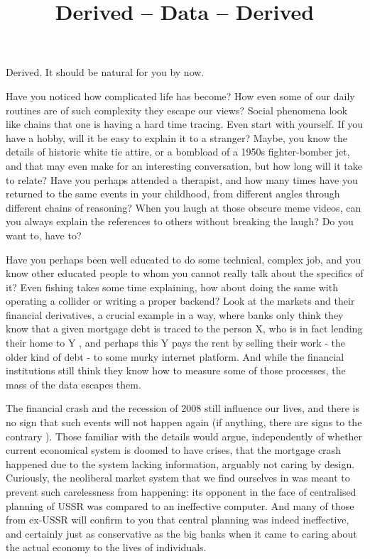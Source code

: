 \documentclass{article}
\title{Derived -- Data -- Derived}
\author{}
\begin{document}
\thispagestyle{empty}

\maketitle

\noindent Derived. It should be natural for you by now.




Have you noticed how complicated life has become? How even some of our daily routines are of such complexity they escape our views? Social phenomena look like chains that one is having a hard time tracing. Even start with yourself. If you have a hobby, will it be easy to explain it to a stranger? Maybe, you know the details of historic white tie attire, or a bombload of a 1950s fighter-bomber jet, and that may even make for an interesting conversation, but how long will it take to relate? Have you perhaps attended a therapist, and how many times have you returned to the same events in your childhood, from different angles through different chains of reasoning?
When you laugh at those obscure meme videos, can you always explain the references to others without breaking the laugh? Do you want to, have to?


Have you perhaps been well educated to do some technical, complex job, and you know other educated people to whom you cannot really talk about the specifics of it? Even fishing takes some time explaining, how about doing the same with operating a collider or writing a proper backend? Look at the markets and their financial derivatives, a crucial example in a way, where banks only think they know that a given mortgage debt is traced to the person X, who is in fact lending their home to Y \cite{BGSHT}, and perhaps this Y pays the rent by selling their work - the older kind of debt - to some murky internet platform. And while the financial institutions still think they know how to measure some of those processes, the mass of the data escapes them.

The financial crash and the recession of 2008 still influence our lives, and there is no sign that such events will not
happen again (if anything, there are signs to the contrary \cite{FORBES}). Those familiar with the details
\cite{BGSHT} would argue, independently of whether current economical system is doomed to have crises,
that the mortgage crash happened due to the system lacking information, arguably not caring by design.
Curiously, the neoliberal market system that we find ourselves in was meant to prevent such carelessness
from happening: its opponent in the face of centralised planning of USSR was compared to an ineffective computer.
And many of those from ex-USSR will confirm to you that central planning was indeed ineffective,
and certainly just as conservative as the big banks when it came to caring about the actual economy to the
lives of individuals.
\end{document}
